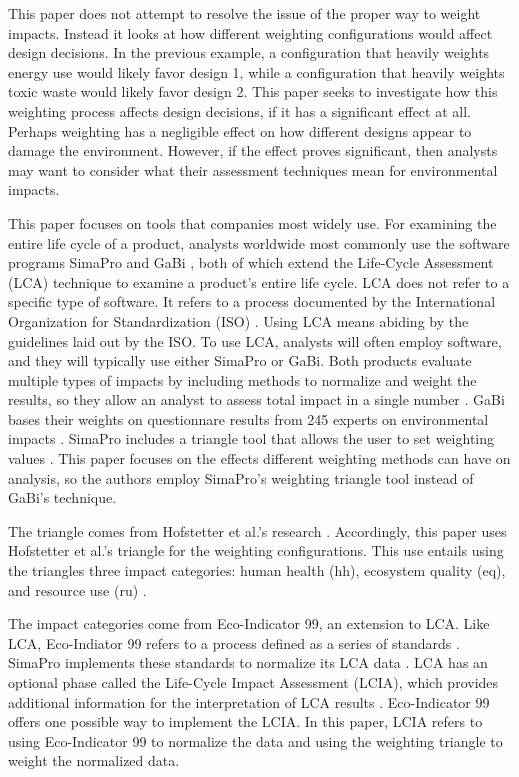 \documentclass[final,journal,10pt,letterpaper,oneside,twocolumn,compsoc]%
{IEEEtran}
\begin{document}
This paper does not attempt to resolve the issue of the proper way to weight
impacts. Instead it looks at how different weighting configurations would affect
design decisions. In the previous example, a configuration that heavily weights
energy use would likely favor design 1, while a configuration that heavily
weights toxic waste would likely favor design 2. This paper seeks to investigate
how this weighting process affects design decisions, if it has a significant
effect at all. Perhaps weighting has a negligible effect on how different
designs appear to damage the environment. However, if the effect proves
significant, then analysts may want to consider what their assessment techniques
mean for environmental impacts.

This paper focuses on tools that companies most widely use. For examining the
entire life cycle of a product, analysts worldwide most commonly use the
software programs SimaPro and GaBi \cite{hermann}, both of which extend the
Life-Cycle Assessment (LCA) technique to examine a product's entire life cycle.
LCA does not refer to a specific type of software. It refers to a process
documented by
the International Organization for Standardization (ISO) \cite{14040}
\cite{14044}. Using LCA means abiding by the guidelines laid out by the ISO.
To use LCA, analysts will often employ software, and they will typically
use either SimaPro or GaBi. Both products evaluate
multiple types of impacts by including methods to normalize and weight the
results, so they allow an analyst to assess total impact in a single number
\cite{gabi} \cite{simapro}. GaBi bases their weights on questionnare results
from 245 experts on environmental impacts \cite{gabi}. SimaPro includes a
triangle tool that allows the user to set weighting values \cite{simapro}. This
paper focuses on the effects different weighting methods can have on
analysis, so the authors employ SimaPro's weighting triangle tool instead of
GaBi's technique.

The triangle comes from Hofstetter et al.'s research \cite{triangle}.
Accordingly, this paper uses Hofstetter et al.'s triangle for the weighting
configurations. This use entails using the triangles three impact categories:
human health (hh), ecosystem quality (eq), and resource use (ru)
\cite{triangle}.

The impact categories come from Eco-Indicator 99, an extension to LCA. Like LCA,
Eco-Indiator 99 refers to a process defined as a series of standards \cite{pre}.
SimaPro implements these standards to normalize its LCA data \cite{simapro}.
LCA has an optional phase called the Life-Cycle Impact
Assessment (LCIA), which provides additional information for the interpretation
of LCA results \cite{14044}. Eco-Indicator 99 offers one possible way
to implement the LCIA. In this paper, LCIA refers to using
Eco-Indicator 99 to normalize the data and using the weighting triangle to
weight the normalized data.
\end{document}
